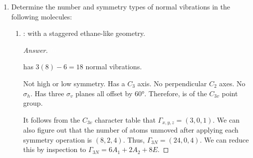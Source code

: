 \documentclass[../psets.tex]{subfiles}
\begin{document}
\begin{enumerate}[label={\Roman*)}]
\begin{proof}[Explanation]
        The structure in Figure \ref{fig:structure-CoCO4SiMe3a}: Not high or low symmetry. Has a $C_2$ axis. No perpendicular $C_2$ axes. No $\sigma_h$. Has two perpendicular $\sigma_v$ planes. Therefore, it is of the $C_{2v}$ point group.\par
        We can determine that $\Gamma_\nu=(4,0,2,2)=2A_1+B_1+B_2$ by counting how many $\overrightarrow{\ce{Co-CO}}$ vectors stay the same under each symmetry operation and decomposing by inspection. With four stretching modes that are all IR active, we can expect there to be four peaks in the infrared spectrum of . Therefore, this is not the correct structure.\par\medskip
        The structure in Figure \ref{fig:structure-CoCO4SiMe3b}: Not high or low symmetry. Has a $C_3$ axis. No perpendicular $C_2$ axes. No $\sigma_h$. Has three $\sigma_v$ planes all offset by $\ang{60}$. Therefore, it is of the $C_{3v}$ point group.\par
        We can determine that $\Gamma_\nu=(4,1,2)=2A_1+E$ by counting how many $\overrightarrow{\ce{Co-CO}}$ vectors stay the same under each symmetry operation and decomposing by inspection. With four $\nu(\ce{CO})$ stretching modes that are all IR active (but two of the four being degenerate), we can expect there to be three peaks in the infrared spectrum of . This confirms that this is the correct structure.
    \end{proof}
    \newpage
    \item Determine the number and symmetry types of normal vibrations in the following molecules:
    \begin{enumerate}[label={\alph*)}]
        \item {}: with a staggered ethane-like geometry.
        \begin{proof}[Answer]
            ${\color{white}hi}$
            \begin{center}
                \footnotesize
            \end{center}
             has $3(8)-6=18$ normal vibrations.\par
            Not high or low symmetry. Has a $C_3$ axis. No perpendicular $C_2$ axes. No $\sigma_h$. Has three $\sigma_v$ planes all offset by $\ang{60}$. Therefore,  is of the $C_{3v}$ point group.\par
            It follows from the $C_{3v}$ character table that $\Gamma_{x,y,z}=(3,0,1)$. We can also figure out that the number of atoms unmoved after applying each symmetry operation is $(8,2,4)$. Thus, $\Gamma_{3N}=(24,0,4)$. We can reduce this by inspection to $\Gamma_{3N}=6A_1+2A_2+8E$.\par

\end{proof}
\end{enumerate}
\end{enumerate}
\end{document}
